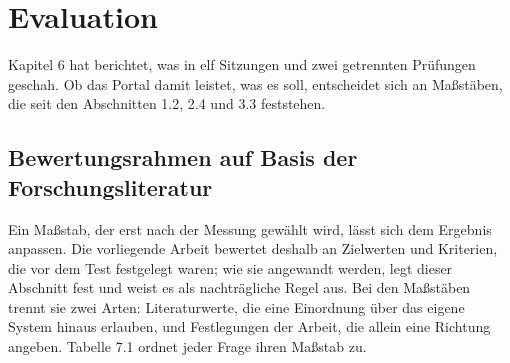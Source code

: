 
\chapter{Evaluation}
\label{kap:evaluation}

Kapitel 6 hat berichtet, was in elf Sitzungen und zwei getrennten Prüfungen geschah. Ob das Portal damit leistet, was es soll, entscheidet sich an Maßstäben, die seit den Abschnitten 1.2, 2.4 und 3.3 feststehen.

\section{Bewertungsrahmen auf Basis der Forschungsliteratur}
\label{sec:bewertungsrahmen}

Ein Maßstab, der erst nach der Messung gewählt wird, lässt sich dem Ergebnis anpassen. Die vorliegende Arbeit bewertet deshalb an Zielwerten und Kriterien, die vor dem Test festgelegt waren; wie sie angewandt werden, legt dieser Abschnitt fest und weist es als nachträgliche Regel aus. Bei den Maßstäben trennt sie zwei Arten: Literaturwerte, die eine Einordnung über das eigene System hinaus erlauben, und Festlegungen der Arbeit, die allein eine Richtung angeben. Tabelle 7.1 ordnet jeder Frage ihren Maßstab zu.

